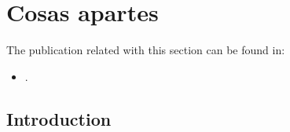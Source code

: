%
\chapter{Cosas apartes}

The publication related with this section can be found in:
\begin{small}
\begin{itemize}
\item {}.
\end{itemize}
\end{small}

\section{Introduction}
\lipsum[6-20]
